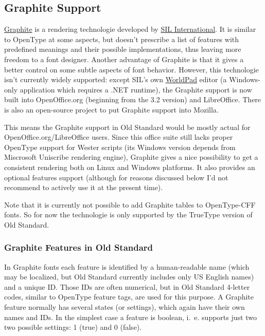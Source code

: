 \documentclass[12pt,a4paper,openany]{book}
\begin{document}
\subsection{Graphite Support}
\hypertarget{Graphite}{}\label{Graphite}

\href{http://scripts.sil.org/Graphite}{Graphite} is a rendering technologie
developed by \href{http://www.sil.org}{SIL International}. It is similar
to OpenType at some aspects, but doesn't prescribe a list of features with
predefined meanings and their possible implementations, thus leaving more
freedom to a font designer. Another advantage of Graphite is that it gives
a better control on some subtle aspects of font behavior. However, this
technologie isn't currently widely supported: except SIL's own
\href{http://scripts.sil.org/WorldPadDownload}{WorldPad} editor (a
Windows-only application which requires a .NET runtime), the Graphite
support is now built into OpenOffice.org (beginning from the 3.2 version)
and LibreOffice. There is also an open-source project to put Graphite
support into Mozilla.

This means the Graphite support in Old Standard would be mostly actual for
OpenOffice.org/LibreOffice users. Since this office suite still lacks
proper OpenType support for Wester scripts (its Windows version depends
from Miscrosoft Uniscribe rendering engine), Graphite gives a nice
possibility to get a consistent rendering both on Linux and Windows
platforms. It also provides an optional features support (although for
reasons discussed below I'd not recommend to actively use it at the
present time).

Note that it is currently not possible to add Graphite tables to
OpenType-CFF fonts. So for now the technologie is only supported by
the TrueType version of Old Standard.

\subsubsection{Graphite Features in Old Standard}

In Graphite fonts each feature is identified by a human-readable name
(which may be localized, but Old Standard currently includes only US
English names) and a unique ID. Those IDs are often numerical, but in
Old Standard 4-letter codes, similar to OpenType feature tags, are used
for this purpose. A Graphite feature normally has several states (or
settings), which again have their own names and IDs. In the simplest case
a feature is boolean, i.~e. supports just two two possible settings: 1
(true) and 0 (false).
\end{document}

